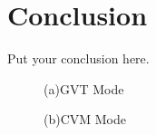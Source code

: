 \documentclass{article}
\begin{document}
%

%

\section{Conclusion}
\label{sec:conclusion}

Put your conclusion here.


\begin{figure}
\begin{minipage}[a]{.48\linewidth}
  \centering
\centerline{}
  \centerline{(a)GVT Mode }\medskip
\end{minipage}
\hfill
\begin{minipage}[b]{0.48\linewidth}
  \centering
  \vspace{1.5cm}
  \centerline{(b)CVM Mode }\medskip
\end{minipage}
%
\caption{}
\label{fig:res}
%
\end{figure}




%
\end{document}
